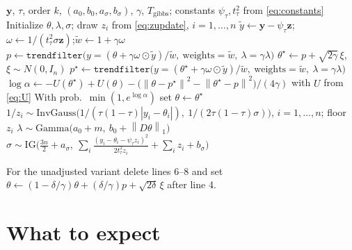 \documentclass[12pt]{article}
\newcommand{\by}{\bm{y}}
\newcommand{\bz}{\bm{z}}
\newcommand{\norm}[1]{\left\lVert#1\right\rVert}
\newcommand{\IG}{\mathrm{IG}}
\newcommand{\InvGauss}{\mathrm{InvGauss}}
\newcommand{\prox}{\mathrm{prox}}
\newcommand{\tf}{\texttt{trendfilter}}
\begin{document}
\begin{algorithm}[h!]
\caption{Gibbs sampler with mixture likelihood and single proximal step (P-MALA, $\delta=\gamma$)}
\begin{algorithmic}[1]
\Require $\by$, $\tau$, order $k$, $(a_0,b_0,a_\sigma,b_\sigma)$, $\gamma$, $T_{\mathrm{gibbs}}$; constants $\psi_\tau,t^2_\tau$ from \eqref{eq:constants}
\State Initialize $\theta,\lambda,\sigma$; draw $z_i$ from \eqref{eq:zupdate}, $i=1,\dots,n$
  \State $\tilde y\leftarrow \by-\psi_\tau\bz$;\quad $\omega\leftarrow 1/(t^2_\tau\sigma\bz)$;\quad $\tilde w\leftarrow1+\gamma\omega$
  \State $p\leftarrow\tf\big(y=(\theta+\gamma\omega\odot\tilde y)/\tilde w,\ \text{weights}=\tilde w,\ \lambda=\gamma\lambda\big)$ \Comment{$=\prox_{\gamma U}(\theta)$}
  \State $\theta^\star\leftarrow p+\sqrt{2\gamma}\,\xi$, $\xi\sim N(0,I_n)$
  \State $p^\star\leftarrow\tf\big(y=(\theta^\star+\gamma\omega\odot\tilde y)/\tilde w,\ \text{weights}=\tilde w,\ \lambda=\gamma\lambda\big)$ \Comment{$=\prox_{\gamma U}(\theta^\star)$}
  \State $\log\alpha\leftarrow -U(\theta^\star)+U(\theta)-\big(\norm{\theta-p^\star}^2-\norm{\theta^\star-p}^2\big)/(4\gamma)$ with $U$ from \eqref{eq:U}
  \State With prob.\ $\min(1,e^{\log\alpha})$ set $\theta\leftarrow\theta^\star$
  \State $1/z_i\sim\InvGauss\big(1/(\tau(1-\tau)|y_i-\theta_i|),\ 1/(2\tau(1-\tau)\sigma)\big)$, $i=1,\dots,n$; floor $z_i$
  \State $\lambda\sim\mathrm{Gamma}\big(a_0+m,\ b_0+\norm{D\theta}_1\big)$
  \State $\sigma\sim\IG\Big(\tfrac{3n}2+a_\sigma,\ \sum_i\frac{(y_i-\theta_i-\psi_\tau z_i)^2}{2t^2_\tau z_i}+\sum_iz_i+b_\sigma\Big)$
\EndFor
\end{algorithmic}
\end{algorithm}
\noindent For the unadjusted variant delete lines 6--8 and set $\theta\leftarrow(1-\delta/\gamma)\theta+(\delta/\gamma)p+\sqrt{2\delta}\,\xi$ after line 4.

\section{What to expect}
\end{document}
